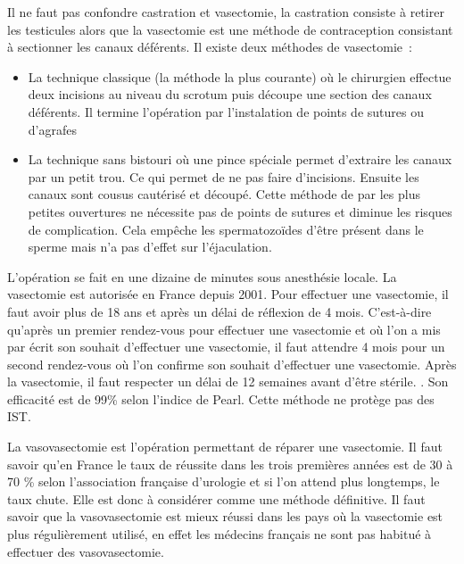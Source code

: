 \documentclass[12pt,a4paper]{report}
\begin{document}
Il ne faut pas confondre castration et vasectomie, la castration consiste à retirer les testicules alors que la vasectomie est une méthode de contraception consistant à sectionner les canaux déférents.
Il existe deux méthodes de vasectomie :
\begin{itemize}
    \item La technique classique (la méthode la plus courante) où le chirurgien effectue deux incisions au niveau du scrotum puis découpe une section des canaux déférents. Il termine l'opération par l'instalation de points de sutures ou d'agrafes \cite{VasectomieToutSavoir2017}\cite{guillaumedaudinContraceptesEnqueteDernier2022}
    \item La technique sans bistouri où une pince spéciale permet d'extraire les canaux par un petit trou. Ce qui permet de ne pas faire d'incisions. Ensuite les canaux sont cousus cautérisé et découpé. Cette méthode de par les plus petites ouvertures ne nécessite pas de points de sutures et diminue les risques de complication. \cite{VasectomieToutSavoir2017}\cite{guillaumedaudinContraceptesEnqueteDernier2022} Cela empêche les spermatozoïdes d'être présent dans le sperme mais n'a pas d'effet sur l'éjaculation.
\end{itemize}
L'opération se fait en une dizaine de minutes sous anesthésie locale. \cite{VasectomieEstelleReversible}
La vasectomie est autorisée en France depuis 2001. \cite{guillaumedaudinContraceptesEnqueteDernier2022} Pour effectuer une vasectomie, il faut avoir plus de 18 ans et après un délai de réflexion de 4 mois. C'est-à-dire qu'après un premier rendez-vous pour effectuer une vasectomie et où l'on a mis par écrit son souhait d'effectuer une vasectomie, il faut attendre 4 mois pour un second rendez-vous où l'on confirme son souhait d'effectuer une vasectomie. \cite{SterilisationViseeContraceptive}
Après la vasectomie, il faut respecter un délai de 12 semaines avant d'être stérile. \cite{associationfrancaisedurologieVasectomieContraceptive2012}. Son efficacité est de 99\% selon l'indice de Pearl. \cite{EfficaciteMoyensContraceptifs}
Cette méthode ne protège pas des IST.

La vasovasectomie est l'opération permettant de réparer une vasectomie. Il faut savoir qu'en France le taux de réussite dans les trois premières années est de 30 à 70 \% selon l'association française d'urologie et si l'on attend plus longtemps, le taux chute. Elle est donc à considérer comme une méthode définitive.\cite{VasectomieEstelleReversible}
Il faut savoir que la vasovasectomie est mieux réussi dans les pays où la vasectomie est plus régulièrement utilisé, en effet les médecins français ne sont pas habitué à effectuer des vasovasectomie. \cite{guillaumedaudinContraceptesEnqueteDernier2022}
\end{document}
